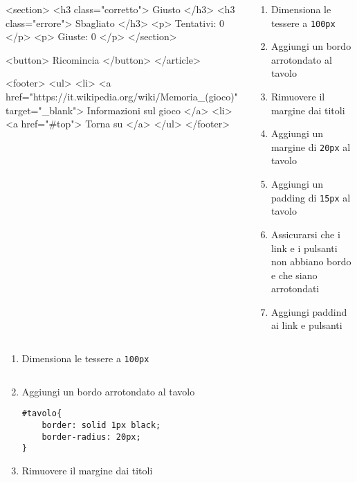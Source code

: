 \begin{frame}[fragile]
\begin{exercise}
\begin{columns}
\begin{column}{.45\textwidth}
{<section>
<h3 class="corretto"> Giusto </h3>
<h3 class="errore"> Sbagliato </h3>
      <p> Tentativi: 0 </p>
      <p> Giuste: 0 </p>
  </section>

  <button> Ricomincia </button>
</article>

<footer>
    <ul>
        <li> <a href="https://it.wikipedia.org/wiki/Memoria_(gioco)" target="_blank"> Informazioni sul gioco </a>
        <li> <a href="#top"> Torna su </a>
    </ul>
</footer>}
      \end{column}
      \begin{column}{.45\textwidth}
        \begin{enumerate}
          \item Dimensiona le tessere a \texttt{100px}
          \item Aggiungi un bordo arrotondato al tavolo
          \item Rimuovere il margine dai titoli
          \item Aggiungi un margine di \texttt{20px} al tavolo
          \item Aggiungi un padding di \texttt{15px} al tavolo
          \item Assicurarsi che i link e i pulsanti non abbiano bordo e che siano arrotondati
          \item Aggiungi paddind ai link e pulsanti
        \end{enumerate}
      \end{column}
    \end{columns}
  \end{exercise}
\end{frame}

\begin{frame}[fragile]\transfade
  \begin{sol}\centering
    \begin{enumerate}
      \item Dimensiona le tessere a \texttt{100px}
      \makeatletter
      \inputminted[breaklines, firstline=34, lastline=37]{css}{\html@dir/\jobname _\thehtml@count.html}
      \item Aggiungi un bordo arrotondato al tavolo
      \begin{verbatim}
#tavolo{
    border: solid 1px black;
    border-radius: 20px;
}
      \end{verbatim}
      \item Rimuovere il margine dai titoli
      \inputminted[breaklines, firstline=15, lastline=18]{css}{\html@dir/\jobname _\thehtml@count.html}
      \makeatother
    \end{enumerate}
  \end{sol}
\end{frame}

